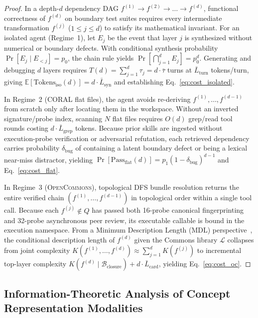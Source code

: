 \documentclass[10pt,twocolumn]{article}
\begin{document}
\begin{proof}
In a depth-$d$ dependency DAG $f^{(1)} \to f^{(2)} \to \dots \to f^{(d)}$, functional correctness of $f^{(d)}$ on boundary test suites requires every intermediate transformation $f^{(j)}$ ($1 \le j \le d$) to satisfy its mathematical invariant.
For an isolated agent (Regime~1), let $E_j$ be the event that layer $j$ is synthesized without numerical or boundary defects. With conditional synthesis probability $\Pr[E_j \mid E_{<j}] = p_0$, the chain rule yields $\Pr[\bigcap_{j=1}^d E_j] = p_0^d$. Generating and debugging $d$ layers requires $T(d) = \sum_{j=1}^d \tau_j = d \cdot \bar{\tau}$ turns at $\bar{L}_{\text{turn}}$ tokens/turn, giving $\mathbb{E}[\text{Tokens}_{\text{iso}}(d)] = d \cdot \bar{L}_{\text{syn}}$ and establishing Eq.~\eqref{eq:cost_isolated}.

In Regime~2 (\textsc{CORAL} flat files), the agent avoids re-deriving $f^{(1)}, \dots, f^{(d-1)}$ from scratch only after locating them in the workspace. Without an inverted signature/probe index, scanning $N$ flat files requires $O(d)$ grep/read tool rounds costing $d \cdot \bar{L}_{\text{grep}}$ tokens. Because prior skills are ingested without execution-probe verification or adversarial refutation, each retrieved dependency carries probability $\delta_{\text{bug}}$ of containing a latent boundary defect or being a lexical near-miss distractor, yielding $\Pr[\text{Pass}_{\text{flat}}(d)] = p_1 (1 - \delta_{\text{bug}})^{d-1}$ and Eq.~\eqref{eq:cost_flat}.

In Regime~3 (\textsc{OpenCommons}), topological DFS bundle resolution returns the entire verified chain $(f^{(1)}, \dots, f^{(d-1)})$ in topological order within a single tool call. Because each $f^{(j)} \notin Q$ has passed both 16-probe canonical fingerprinting and 32-probe asynchronous peer review, its executable callable is bound in the execution namespace. From a Minimum Description Length (MDL) perspective~\cite{rissanen1978modeling}, the conditional description length of $f^{(d)}$ given the Commons library $\mathcal{L}$ collapses from joint complexity $K(f^{(1)}, \dots, f^{(d)}) \approx \sum_{j=1}^d K(f^{(j)})$ to incremental top-layer complexity $K(f^{(d)} \mid \mathcal{B}_{\text{closure}}) + d \cdot \bar{L}_{\text{card}}$, yielding Eq.~\eqref{eq:cost_oc}.
\end{proof}

\subsection{Information-Theoretic Analysis of Concept Representation Modalities}
\end{document}
